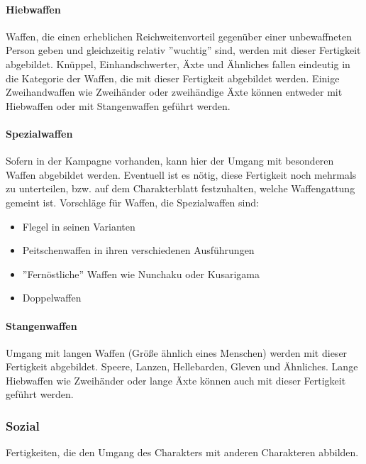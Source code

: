 \documentclass{article}
\begin{document}
\paragraph{Hiebwaffen}

Waffen, die einen erheblichen Reichweitenvorteil gegenüber einer unbewaffneten Person geben und gleichzeitig relativ
''wuchtig'' sind, werden mit dieser Fertigkeit abgebildet. Knüppel, Einhandschwerter, Äxte und Ähnliches fallen
eindeutig in die Kategorie der Waffen, die mit dieser Fertigkeit abgebildet werden. Einige Zweihandwaffen wie
Zweihänder oder zweihändige Äxte können entweder mit Hiebwaffen oder mit Stangenwaffen geführt werden.

\paragraph{Spezialwaffen}

Sofern in der Kampagne vorhanden, kann hier der Umgang mit besonderen Waffen abgebildet werden. Eventuell ist es nötig,
diese Fertigkeit noch mehrmals zu unterteilen, bzw. auf dem Charakterblatt festzuhalten, welche Waffengattung gemeint
ist. Vorschläge für Waffen, die Spezialwaffen sind:

\begin{itemize}
\item Flegel in seinen Varianten
\item Peitschenwaffen in ihren verschiedenen Ausführungen
\item ''Fernöstliche'' Waffen wie Nunchaku oder Kusarigama
\item Doppelwaffen
\end{itemize}

\paragraph{Stangenwaffen}

Umgang mit langen Waffen (Größe ähnlich eines Menschen) werden mit dieser Fertigkeit abgebildet. Speere, Lanzen,
Hellebarden, Gleven und Ähnliches. Lange Hiebwaffen wie Zweihänder oder lange Äxte können auch mit dieser Fertigkeit
geführt werden.

\subsubsection{Sozial}

Fertigkeiten, die den Umgang des Charakters mit anderen Charakteren abbilden.
\end{document}
